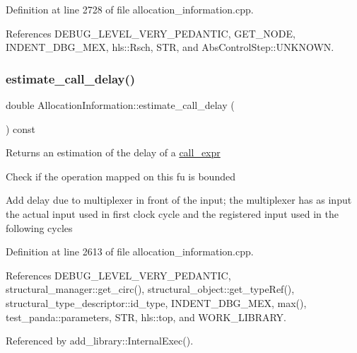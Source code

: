 Definition at line 2728 of file allocation\+\_\+information.\+cpp.



References D\+E\+B\+U\+G\+\_\+\+L\+E\+V\+E\+L\+\_\+\+V\+E\+R\+Y\+\_\+\+P\+E\+D\+A\+N\+T\+IC, G\+E\+T\+\_\+\+N\+O\+DE, I\+N\+D\+E\+N\+T\+\_\+\+D\+B\+G\+\_\+\+M\+EX, hls\+::\+Rsch, S\+TR, and Abs\+Control\+Step\+::\+U\+N\+K\+N\+O\+WN.

\mbox{\label{classAllocationInformation_a8c3a54df4f2c6858cc39399fdad52bcf}} 
\subsubsection{\texorpdfstring{estimate\+\_\+call\+\_\+delay()}{estimate\_call\_delay()}}
{\footnotesize\ttfamily double Allocation\+Information\+::estimate\+\_\+call\+\_\+delay (\begin{DoxyParamCaption}{ }\end{DoxyParamCaption}) const}

\begin{DoxyReturn}{Returns}
an estimation of the delay of a \hyperlink{structcall__expr}{call\+\_\+expr} 
\end{DoxyReturn}
Check if the operation mapped on this fu is bounded

Add delay due to multiplexer in front of the input; the multiplexer has as input the actual input used in first clock cycle and the registered input used in the following cycles 

Definition at line 2613 of file allocation\+\_\+information.\+cpp.



References D\+E\+B\+U\+G\+\_\+\+L\+E\+V\+E\+L\+\_\+\+V\+E\+R\+Y\+\_\+\+P\+E\+D\+A\+N\+T\+IC, structural\+\_\+manager\+::get\+\_\+circ(), structural\+\_\+object\+::get\+\_\+type\+Ref(), structural\+\_\+type\+\_\+descriptor\+::id\+\_\+type, I\+N\+D\+E\+N\+T\+\_\+\+D\+B\+G\+\_\+\+M\+EX, max(), test\+\_\+panda\+::parameters, S\+TR, hls\+::top, and W\+O\+R\+K\+\_\+\+L\+I\+B\+R\+A\+RY.



Referenced by add\+\_\+library\+::\+Internal\+Exec().

